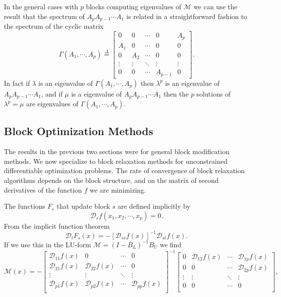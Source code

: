 \documentclass[
  12pt,
]{book}
\begin{document}
In the general cases with \(p\) blocks computing eigenvalues of \(\mathcal{M}\) we can use the result that the spectrum of \(A_pA_{p-1}\cdots A_1\) is related in a straightforward fashion to the spectrum of the cyclic matrix
\[
\Gamma(A_1,\cdots,A_p)\mathop{=}\limits^{\Delta}\begin{bmatrix}
0&0&\cdots&0&A_p\\
A_1&0&\cdots&0&0\\
0&A_2&\cdots&0&0\\
\vdots&\vdots&\ddots&\vdots&\vdots\\
0&0&\cdots&A_{p-1}&0
\end{bmatrix}.
\]
In fact if \(\lambda\) is an eigenvalue of \(\Gamma(A_1,\cdots,A_p)\) then \(\lambda^p\) is an eigenvalue of \(A_pA_{p-1}\cdots A_1\), and if \(\mu\) is a eigenvalue of \(A_pA_{p-1}\cdots A_1\)
then the \(p\) solutions of \(\lambda^p=\mu\) are eigenvalues of \(\Gamma(A_1,\cdots,A_p)\).

\hypertarget{blockrelaxation:rateofconvergence:blockoptimizationmethods}{%
\subsection{Block Optimization Methods}\label{blockrelaxation:rateofconvergence:blockoptimizationmethods}}

The results in the previous two sections were for general block modification methods. We now specialize to block relaxation methods for unconstrained differentiable optimization problems.
The rate of convergence of block relaxation algorithms depends on
the block structure, and on the matrix of second derivatives
of the function \(f\) we are minimizing.

The functions \(F_s\) that update block \(s\) are defined implicitly by
\[
\mathcal{D}_sf(x_1,x_2,\cdots,x_p)=0.
\]
From the implicit function theorem
\[
\mathcal{D}_tF_s(x)=-[\mathcal{D}_{ss}f(x)]^{-1}\mathcal{D}_{st}f(x).
\]
If we use this in the LU-form \(\mathcal{M}=(I-B_L)^{-1}B_U\) we find
\[
\mathcal{M}(x)=-
\begin{bmatrix}
\mathcal{D}_{11}f(x)&0&\cdots&0\\
\mathcal{D}_{21}f(x)&\mathcal{D}_{22}f(x)&\cdots&0\\
\vdots&\vdots&\ddots&\vdots\\
\mathcal{D}_{p1}f(x)&\mathcal{D}_{p2}f(x)&\cdots&\mathcal{D}_{pp}f(x)\\
\end{bmatrix}^{-1}
\begin{bmatrix}
0&\mathcal{D}_{12}f(x)&\cdots&\mathcal{D}_{1p}f(x)\\
0&0&\cdots&\mathcal{D}_{2p}f(x)\\
\vdots&\vdots&\ddots&\vdots\\
0&0&\cdots&0\\
\end{bmatrix},
\]
\end{document}
